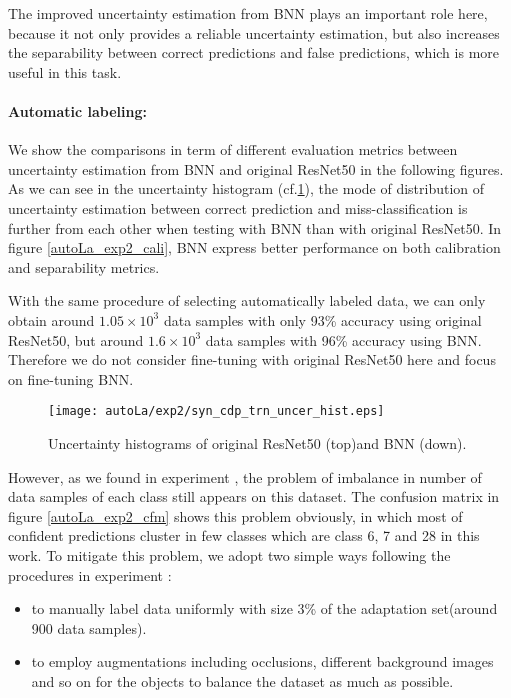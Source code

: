 The improved uncertainty estimation from BNN plays an important role here, because it not only provides a reliable uncertainty estimation, but also increases the separability between correct predictions and false predictions, which is more useful in this task. 

\paragraph{Automatic labeling:}
We show the comparisons in term of different evaluation metrics between uncertainty estimation from BNN and original ResNet50 in the following figures. As we can see in the uncertainty histogram (cf.\ref{autoLa_exp2_hist}), the mode of distribution of uncertainty estimation between correct prediction and miss-classification is further from each other when testing with BNN than with original ResNet50. In figure \ref{autoLa_exp2_cali}, BNN express better performance on both calibration and separability metrics. 

With the same procedure of selecting automatically labeled data, we can only obtain around $1.05\times10^3$ data samples with only 93\% accuracy using original ResNet50, but around $1.6\times10^3$ data samples with 96\% accuracy using BNN. Therefore we do not consider fine-tuning with original ResNet50 here and focus on fine-tuning BNN.

\begin{figure}[h!]
	\begin{center}
		\texttt{[image: autoLa/exp2/syn\_cdp\_trn\_uncer\_hist.eps]}
		\caption{Uncertainty histograms of original ResNet50 (top)and BNN (down).}		
		\label{autoLa_exp2_hist}
	\end{center}
\end{figure}
However, as we found in experiment , the problem of imbalance in number of data samples of each class still appears on this dataset. The confusion matrix in figure \ref{autoLa_exp2_cfm} shows this problem obviously, in which most of confident predictions cluster in few classes which are class 6, 7 and 28 in this work. To mitigate this problem, we adopt two simple ways following the procedures in experiment :
\begin{itemize}
\item to manually label data uniformly with size 3\% of the adaptation set(around 900 data samples).
\item to employ augmentations including occlusions, different background images and so on for the objects to balance the dataset as much as possible.  
\end{itemize} 

